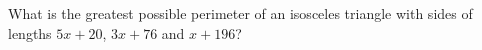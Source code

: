 What is the greatest possible perimeter of an isosceles triangle with sides of lengths $5x+20$, $3x+76$ and $x+196$?

